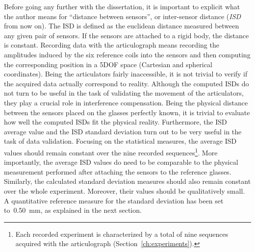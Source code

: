 Before going any further with the dissertation, it is important to explicit what
the author means for ``distance between sensors'', or inter-sensor distance 
(\emph{ISD} from now on).
The ISD is defined as the euclidean distance measured between any given pair 
of sensors.
If the sensors are attached to a rigid body, the distance is constant. 
Recording data with the articulograph means recording the amplitudes induced
by the six reference coils into the sensors and then computing the corresponding
position in a 5DOF space (Cartesian and spherical coordinates).
Being the articulators fairly inaccessible, it is not trivial to verify if the
acquired data actually correspond to reality.
Although the computed ISDs do not turn to be useful in the task of validating
the movement of the articulators, they play a crucial role in 
interference compensation.
Being the physical distance between the sensors placed on the glasses perfectly
known, it is trivial to evaluate how well the computed ISDs fit the physical
reality.
Furthermore, the ISD average value and the ISD standard deviation 
turn out to be very useful in the task of data validation.
Focusing on the statistical measures, the average ISD values should remain
constant over the nine recorded sequences\footnote{Each recorded experiment is
characterized by a total of nine sequences acquired with the articulograph 
(Section~\ref{ch:experiments}).}.
More importantly, the average ISD values do need to be comparable to the
physical measurement performed after attaching the sensors to the reference
glasses.
Similarly, the calculated standard deviation measures should also remain
constant over the whole experiment.
Moreover, their values should be qualitatively small.
A quantitative reference measure for the standard deviation has been set
to~0.50~mm, as explained in the next section.


